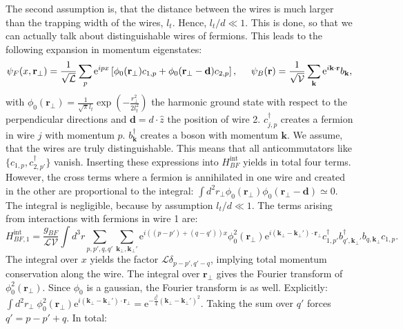 The second assumption is, that the distance between the wires is much larger than the trapping width of the wires, $l_t$. Hence, $l_t/d \ll 1$. This is done, so that we can actually talk about distinguishable wires of fermions. This leads to the following expansion in momentum eigenstates:
\begin{equation}
\psi_F(x,\mathbf{r}_\perp) = \frac{1}{\sqrt{\mathcal{L}}}\sum_p \text{e}^{ipx} \left[\phi_0(\mathbf{r}_\perp) c_{1,p} + \phi_0(\mathbf{r}_\perp - \mathbf{d}) c_{2,p}\right], \hspace{0.5cm} \psi_B(\mathbf{r}) = \frac{1}{\sqrt{\mathcal{V}}}\sum_{\mathbf{k}} \text{e}^{i\mathbf{k}\cdot \mathbf{r}} b_\mathbf{k}, 
\end{equation}  
with $\phi_0(\mathbf{r}_\perp) = \frac{1}{\sqrt{\pi}l_t}\exp\left(-\frac{r_\perp^2}{2l_t^2}\right)$ the harmonic ground state with respect to the perpendicular directions and $\mathbf{d} = d\cdot\hat{z}$ the position of wire 2. $c^\dagger_{j,p}$ creates a fermion in wire $j$ with momentum $p$. $b^\dagger_\mathbf{k}$ creates a boson with momentum $\mathbf{k}$.  We assume, that the wires are truly distinguishable. This means that all anticommutators like $\{c_{1,p}, c^\dagger_{2,p'}\}$ vanish. Inserting these expressions into $H_{BF}^\text{int}$ yields in total four terms. However, the cross terms where a fermion is annihilated in one wire and created in the other are proportional to the integral: $\int d^2 r_\perp \phi_0(\mathbf{r}_\perp)\phi_0(\mathbf{r}_\perp-\mathbf{d}) \simeq 0$. The integral is negligible, because by assumption $l_t/d \ll 1$. The terms arising from interactions with fermions in wire 1 are:
\begin{equation}
H_{BF, 1}^{\text{int}} = \frac{g_{BF}}{\mathcal{LV}}\int d^3 r \sum_{p,p',q,q'}\sum_{\mathbf{k}_{\perp},\mathbf{k}_{\perp}'}\text{e}^{i((p-p')+(q-q'))x} \phi^2_0(\mathbf{r}_{\perp})\text{e}^{i(\mathbf{k}_{\perp} - \mathbf{k}_{\perp}')\cdot \mathbf{r}_\perp} c^\dagger_{1,p'} b^\dagger_{q',\mathbf{k}_\perp'}b_{q,\mathbf{k}_\perp}c_{1,p}. \nonumber
\end{equation}
The integral over $x$ yields the factor $\mathcal{L}\delta_{p-p',q'-q}$, implying total momentum conservation along the wire. The integral over $\mathbf{r}_\perp$ gives the Fourier transform of $\phi_0^2(\mathbf{r}_\perp)$. Since $\phi_0$ is a gaussian, the Fourier transform is as well. Explicitly: $\int d^2 r_\perp \; \phi^2_0(\mathbf{r}_{\perp})\text{e}^{i(\mathbf{k}_{\perp}-\mathbf{k}_{\perp}')\cdot \mathbf{r}_\perp} = \text{e}^{-\frac{l_t^2}{4}(\mathbf{k}_{\perp}-\mathbf{k}_{\perp}')^2}$. Taking the sum over $q'$ forces $q' = p - p' + q$. In total:
